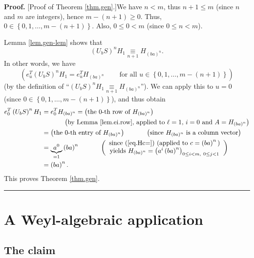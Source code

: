 \documentclass[numbers=enddot,12pt,final,onecolumn,notitlepage]{scrartcl}%
\theoremstyle{definition}
\newenvironment{proof}[1][Proof]{\noindent\textbf{#1.} }{\ \rule{0.5em}{0.5em}}
\begin{document}
\begin{proof}
[Proof of Theorem \ref{thm.gen}.]We have $n<m$, thus $n+1\leq m$ (since $n$
and $m$ are integers), hence $m-\left(  n+1\right)  \geq0$. Thus,
$0\in\left\{  0,1,\ldots,m-\left(  n+1\right)  \right\}  $. Also, $0\leq0<m$
(since $0\leq n<m$).

Lemma \ref{lem.gen-lem} shows that
\[
\left(  U_{b}S\right)  ^{n}H_{1}\underset{n+1}{\equiv}H_{\left(  ba\right)
^{n}}.
\]
In other words, we have
\[
\left(  e_{u}^{T}\left(  U_{b}S\right)  ^{n}H_{1}=e_{u}^{T}H_{\left(
ba\right)  ^{n}}\ \ \ \ \ \ \ \ \ \ \text{for all }u\in\left\{  0,1,\ldots
,m-\left(  n+1\right)  \right\}  \right)
\]
(by the definition of \textquotedblleft$\left(  U_{b}S\right)  ^{n}%
H_{1}\underset{n+1}{\equiv}H_{\left(  ba\right)  ^{n}}$\textquotedblright). We
can apply this to $u=0$ (since $0\in\left\{  0,1,\ldots,m-\left(  n+1\right)
\right\}  $), and thus obtain%
\begin{align*}
e_{0}^{T}\left(  U_{b}S\right)  ^{n}H_{1}  &  =e_{0}^{T}H_{\left(  ba\right)
^{n}}=\left(  \text{the }0\text{-th row of }H_{\left(  ba\right)  ^{n}}\right)
\\
&  \ \ \ \ \ \ \ \ \ \ \left(  \text{by Lemma \ref{lem.ei.row}, applied to
}\ell=1\text{, }i=0\text{ and }A=H_{\left(  ba\right)  ^{n}}\right) \\
&  =\left(  \text{the }0\text{-th entry of }H_{\left(  ba\right)  ^{n}%
}\right)  \ \ \ \ \ \ \ \ \ \ \left(  \text{since }H_{\left(  ba\right)  ^{n}%
}\text{ is a column vector}\right) \\
&  =\underbrace{a^{0}}_{=1}\left(  ba\right)  ^{n}\ \ \ \ \ \ \ \ \ \ \left(
\begin{array}
[c]{c}%
\text{since (\ref{eq.Hc=}) (applied to }c=\left(  ba\right)  ^{n}\text{)}\\
\text{yields }H_{\left(  ba\right)  ^{n}}=\left(  a^{i}\left(  ba\right)
^{n}\right)  _{0\leq i<m,\ 0\leq j<1}%
\end{array}
\right) \\
&  =\left(  ba\right)  ^{n}.
\end{align*}
This proves Theorem \ref{thm.gen}.
\end{proof}


\section{\label{sect.weyl}A Weyl-algebraic application}

\subsection{The claim}
\end{document}
